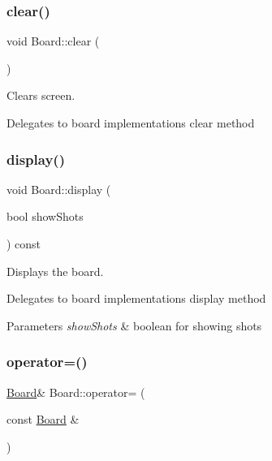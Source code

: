 \subsubsection{\texorpdfstring{clear()}{clear()}}
{\footnotesize\ttfamily void Board\+::clear (\begin{DoxyParamCaption}{ }\end{DoxyParamCaption})}



Clears screen. 

Delegates to board implementation\textquotesingle{}s clear method \mbox{\label{class_board_a47f5e3908bd99b9cf1a9ed2050b7cfd9}} 
\subsubsection{\texorpdfstring{display()}{display()}}
{\footnotesize\ttfamily void Board\+::display (\begin{DoxyParamCaption}\item[{bool}]{show\+Shots }\end{DoxyParamCaption}) const}



Displays the board. 

Delegates to board implementation\textquotesingle{}s display method 
\begin{DoxyParams}{Parameters}
{\em show\+Shots} & boolean for showing shots \\
\hline
\end{DoxyParams}
\mbox{\label{class_board_a892306c4b944bfe904b297092763084a}} 
\subsubsection{\texorpdfstring{operator=()}{operator=()}}
{\footnotesize\ttfamily \mbox{\hyperlink{class_board}{Board}}\& Board\+::operator= (\begin{DoxyParamCaption}\item[{const \mbox{\hyperlink{class_board}{Board}} \&}]{ }\end{DoxyParamCaption})\hspace{0.3cm}{\ttfamily [delete]}}

\mbox{\label{class_board_a47be427a7c565e29dd2606c95972bf91}} 
